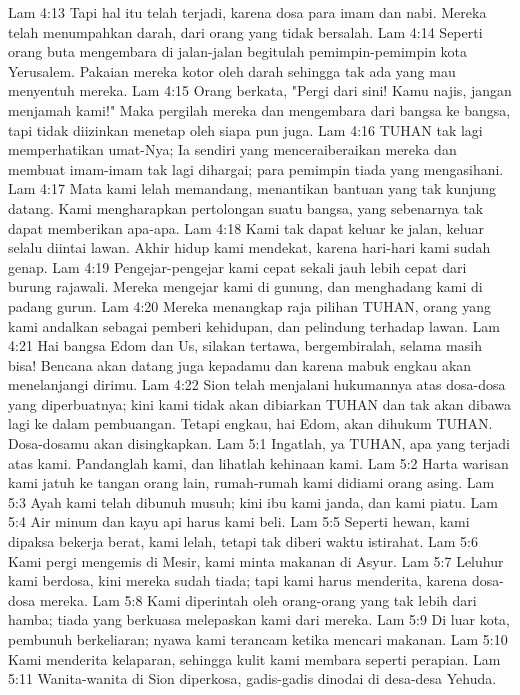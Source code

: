 Lam 4:13  Tapi hal itu telah terjadi, karena dosa para imam dan nabi. Mereka telah menumpahkan darah, dari orang yang tidak bersalah.
Lam 4:14  Seperti orang buta mengembara di jalan-jalan begitulah pemimpin-pemimpin kota Yerusalem. Pakaian mereka kotor oleh darah sehingga tak ada yang mau menyentuh mereka.
Lam 4:15  Orang berkata, "Pergi dari sini! Kamu najis, jangan menjamah kami!" Maka pergilah mereka dan mengembara dari bangsa ke bangsa, tapi tidak diizinkan menetap oleh siapa pun juga.
Lam 4:16  TUHAN tak lagi memperhatikan umat-Nya; Ia sendiri yang menceraiberaikan mereka dan membuat imam-imam tak lagi dihargai; para pemimpin tiada yang mengasihani.
Lam 4:17  Mata kami lelah memandang, menantikan bantuan yang tak kunjung datang. Kami mengharapkan pertolongan suatu bangsa, yang sebenarnya tak dapat memberikan apa-apa.
Lam 4:18  Kami tak dapat keluar ke jalan, keluar selalu diintai lawan. Akhir hidup kami mendekat, karena hari-hari kami sudah genap.
Lam 4:19  Pengejar-pengejar kami cepat sekali jauh lebih cepat dari burung rajawali. Mereka mengejar kami di gunung, dan menghadang kami di padang gurun.
Lam 4:20  Mereka menangkap raja pilihan TUHAN, orang yang kami andalkan sebagai pemberi kehidupan, dan pelindung terhadap lawan.
Lam 4:21  Hai bangsa Edom dan Us, silakan tertawa, bergembiralah, selama masih bisa! Bencana akan datang juga kepadamu dan karena mabuk engkau akan menelanjangi dirimu.
Lam 4:22  Sion telah menjalani hukumannya atas dosa-dosa yang diperbuatnya; kini kami tidak akan dibiarkan TUHAN dan tak akan dibawa lagi ke dalam pembuangan. Tetapi engkau, hai Edom, akan dihukum TUHAN. Dosa-dosamu akan disingkapkan.
Lam 5:1  Ingatlah, ya TUHAN, apa yang terjadi atas kami. Pandanglah kami, dan lihatlah kehinaan kami.
Lam 5:2  Harta warisan kami jatuh ke tangan orang lain, rumah-rumah kami didiami orang asing.
Lam 5:3  Ayah kami telah dibunuh musuh; kini ibu kami janda, dan kami piatu.
Lam 5:4  Air minum dan kayu api harus kami beli.
Lam 5:5  Seperti hewan, kami dipaksa bekerja berat, kami lelah, tetapi tak diberi waktu istirahat.
Lam 5:6  Kami pergi mengemis di Mesir, kami minta makanan di Asyur.
Lam 5:7  Leluhur kami berdosa, kini mereka sudah tiada; tapi kami harus menderita, karena dosa-dosa mereka.
Lam 5:8  Kami diperintah oleh orang-orang yang tak lebih dari hamba; tiada yang berkuasa melepaskan kami dari mereka.
Lam 5:9  Di luar kota, pembunuh berkeliaran; nyawa kami terancam ketika mencari makanan.
Lam 5:10  Kami menderita kelaparan, sehingga kulit kami membara seperti perapian.
Lam 5:11  Wanita-wanita di Sion diperkosa, gadis-gadis dinodai di desa-desa Yehuda.
